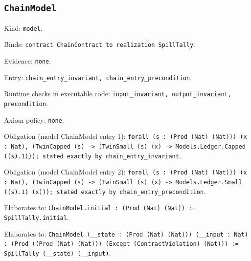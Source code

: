 \documentclass[11pt]{article}
\begin{document}
\subsection*{\texttt{ChainModel}}
\noindent Kind: \texttt{model}.\par
\noindent Binds: \texttt{contract ChainContract to realization SpillTally}.\par
\noindent Evidence: \texttt{none}.\par
\noindent Entry: \texttt{chain\_entry\_invariant, chain\_entry\_precondition}.\par
\noindent Runtime checks in executable code: \texttt{input\_invariant, output\_invariant, precondition}.\par
\noindent Axiom policy: \texttt{none}.\par
\noindent Obligation (model ChainModel entry 1): \texttt{forall (s : (Prod (Nat) (Nat))) (x : Nat), (TwinCapped (s) -> (TwinSmall (s) (x) -> Models.Ledger.Capped ((s).1))); stated exactly by chain\_entry\_invariant}.\par
\noindent Obligation (model ChainModel entry 2): \texttt{forall (s : (Prod (Nat) (Nat))) (x : Nat), (TwinCapped (s) -> (TwinSmall (s) (x) -> Models.Ledger.Small ((s).1) (x))); stated exactly by chain\_entry\_precondition}.\par
\noindent Elaborates to: \texttt{ChainModel.initial : (Prod (Nat) (Nat)) := SpillTally.initial}.\par
\noindent Elaborates to: \texttt{ChainModel (\_\_state : (Prod (Nat) (Nat))) (\_\_input : Nat) : (Prod ((Prod (Nat) (Nat))) (Except (ContractViolation) (Nat))) := SpillTally (\_\_state) (\_\_input)}.\par
\end{document}
